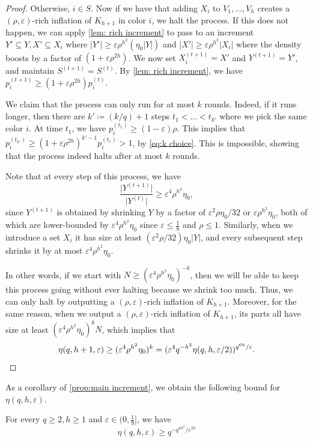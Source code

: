 \documentclass[11pt]{article}
\numberwithin{equation}{section}
\theoremstyle{plain}
\theoremstyle{remark}
\newcommand{\eps}{\ensuremath{\varepsilon}}
\newcommand\ab[1]{\lvert #1 \rvert}
\newcommand\up[1]{^{(#1)}}
\begin{document}
\begin{proof}
Otherwise, $i\in S$. Now if we have that adding $X_i$ to $V_1,\dots,V_{h}$ creates a $(\rho,\eps)$-rich inflation of $K_{h+1}$ in color $i$, we halt the process. If this does not happen, we can apply \cref{lem: rich increment} to pass to an increment $Y'\subseteq Y,X'\subseteq X_i$ where $|Y'|\ge \eps \rho^{h^2}(\eta_0 \ab{Y})$ and $|X'|\ge \eps \rho^{h^2}|X_i|$ where the density boosts by a factor of $(1+\eps\rho^{2h})$. We now set $X_i \up{t+1}=X'$ and $Y\up{t+1} = Y'$, and maintain $S\up{t+1}=S\up t$. By \cref{lem: rich increment}, we have $p_i\up{t+1} \geq (1+\eps \rho^{2h})p_i\up t$.

We claim that the process can only run for at most $k$ rounds. Indeed, if it runs longer, then there are $k'\coloneqq (k/q)+1$ steps $t_1<\dots <t_{k'}$ where we pick the same color $i$. At time $t_1$, we have $p_i\up{t_1}\ge (1-\eps)\rho$. This implies that $p_i\up {t_{k'}} \ge (1+\eps\rho^{2h})^{k'-1}p_i\up {t_1}>1$, by \eqref{eq:k choice}. This is impossible, showing that the process indeed halts after at most $k$ rounds.

Note that at every step of this process, we have
\[
\frac{\ab{Y\up{t+1}}}{\ab{Y\up t}} \geq \eps^4 \rho^{h^2} \eta_0,
\]
since $Y\up {t+1}$ is obtained by shrinking $Y$ by a factor of $\eps^2 \rho\eta_0/32$ or $\eps \rho^{h^2}\eta_0$, both of which are lower-bounded by $\eps^4 \rho^{h^2}\eta_0$ since $\eps \leq \frac 18$ and $\rho \leq 1$. Similarly, when we introduce a set $X_i$ it has size at least $(\eps^2 \rho/32)\eta_0 \ab Y$, and every subsequent step shrinks it by at most $\eps^4 \rho^{h^2} \eta_0$.

In other words, if we start with $N \geq (\eps^4 \rho^{h^2}\eta_0)^{-k}$, then we will be able to keep this process going without ever halting because we shrink too much. Thus, we can only halt by outputting a $(\rho,\eps)$-rich inflation of $K_{h+1}$. Moreover, for the same reason, when we output a $(\rho,\eps)$-rich inflation of $K_{h+1}$, its parts all have size at least $(\eps^4 \rho^{h^2}\eta_0)^k N$, which implies that
\[
\eta(q,h+1,\eps) \geq (\eps^4 \rho^{h^2} \eta_0)^k = (\eps^4 q^{-h^2} \eta(q,h,\eps/2))^{q^{6h}/\eps}.\qedhere
\]
\end{proof}
As a corollary of \cref{prop:main increment}, we obtain the following bound for $\eta(q,h,\eps)$.
\begin{corollary}\label{cor:eta LB}
    For every $q\geq 2,h \geq 1$ and $\eps \in (0,\frac 19]$, we have
    \[
    \eta(q,h,\eps) \geq q^{-q^{4h^2}/\eps^{2h}}
    \]
\end{corollary}
\end{document}
